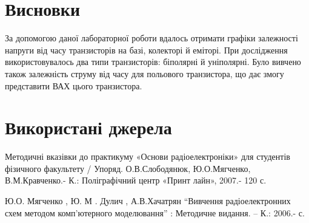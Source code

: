 \section{Висновки}
\qquad За допомогою даної лабораторної роботи вдалось отримати графіки
залежності напруги від часу транзисторів на базі, колекторі й еміторі. При
дослідження використовувалось два типи транзисторів: біполярні й уніполярні.
Було вивчено також залежність струму від часу для польового транзистора, що
дає змогу представити ВАХ цього транзистора.

\section{Використані джерела}

\qquad Методичні вказівки до практикуму «Основи радіоелектроніки»
для студентів фізичного факультету / Упоряд. О.В.Слободянюк,
Ю.О.Мягченко, В.М.Кравченко.- К.: Поліграфічний центр «Принт
лайн», 2007.- 120 с.

\qquad Ю.О. Мягченко , Ю. М . Дулич , А.В.Хачатрян “Вивчення
радіоелектронних схем методом комп’ютерного моделювання” :
Методичне видання. – К.: 2006.- с.
